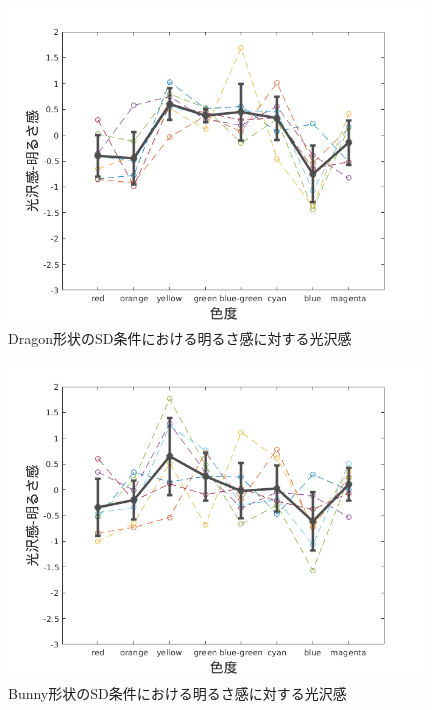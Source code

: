             \newpage
            \begin{figure}[h]
                \centering
                \includegraphics[width=11.0cm]{./img/ex4_DSD.png}
                \caption{Dragon形状のSD条件における明るさ感に対する光沢感}
                \label{ex4_DSD}
            \end{figure}

            \begin{figure}[h]
                \centering
                \includegraphics[width=11.0cm]{./img/ex4_BSD.png}
                \caption{Bunny形状のSD条件における明るさ感に対する光沢感}
                \label{ex4_BSD}
            \end{figure}
            
